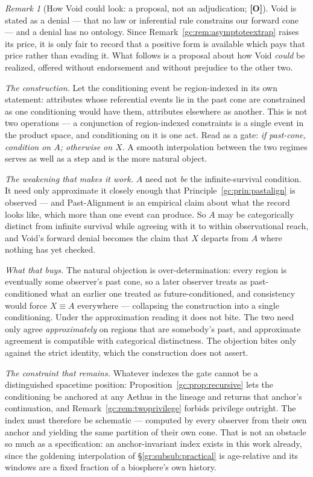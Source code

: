\documentclass[11pt]{article}
\numberwithin{equation}{section}
\theoremstyle{plain}
\theoremstyle{definition}
\theoremstyle{remark}
\newtheorem{remark}[theorem]{Remark}
\begin{document}
\begin{remark}[How Void could look: a proposal, not an adjudication;
\textbf{[O]}]\label{gc:rem:voidontology}
Void is stated as a denial --- that no law or inferential rule
constrains our forward cone --- and a denial has no ontology. Since
Remark~\ref{gc:rem:asymptoteextrap} raises its price, it is only fair to
record that a positive form is available which pays that price rather
than evading it. What follows is a proposal about how Void \emph{could}
be realized, offered without endorsement and without prejudice to the
other two.

\emph{The construction.} Let the conditioning event be region-indexed in
its own statement: attributes whose referential events lie in the past
cone are constrained as one conditioning would have them, attributes
elsewhere as another. This is not two operations --- a conjunction of
region-indexed constraints is a single event in the product space, and
conditioning on it is one act. Read as a gate: \emph{if past-cone,
condition on $A$; otherwise on $X$}. A smooth interpolation between the
two regimes serves as well as a step and is the more natural object.

\emph{The weakening that makes it work.} $A$ need not \emph{be} the
infinite-survival condition. It need only approximate it closely enough
that Principle~\ref{gc:prin:pastalign} is observed --- and
Past-Alignment is an empirical claim about what the record looks like,
which more than one event can produce. So $A$ may be categorically
distinct from infinite survival while agreeing with it to within
observational reach, and Void's forward denial becomes the claim that
$X$ departs from $A$ where nothing has yet checked.

\emph{What that buys.} The natural objection is over-determination:
every region is eventually some observer's past cone, so a later
observer treats as past-conditioned what an earlier one treated as
future-conditioned, and consistency would force $X\equiv A$ everywhere
--- collapsing the construction into a single conditioning. Under the
approximation reading it does not bite. The two need only agree
\emph{approximately} on regions that are somebody's past, and
approximate agreement is compatible with categorical distinctness. The
objection bites only against the strict identity, which the construction
does not assert.

\emph{The constraint that remains.} Whatever indexes the gate cannot be
a distinguished spacetime position: Proposition~\ref{gc:prop:recursive}
lets the conditioning be anchored at any Aethus in the lineage and
returns that anchor's continuation, and
Remark~\ref{gc:rem:twoprivilege} forbids privilege outright. The index
must therefore be schematic --- computed by every observer from their
own anchor and yielding the same partition of their own cone. That is
not an obstacle so much as a specification: an anchor-invariant index
exists in this work already, since the goldening interpolation of
\S\ref{gr:subsub:practical} is age-relative and its windows are a fixed
fraction of a biosphere's own history.


\end{remark}
\end{document}

